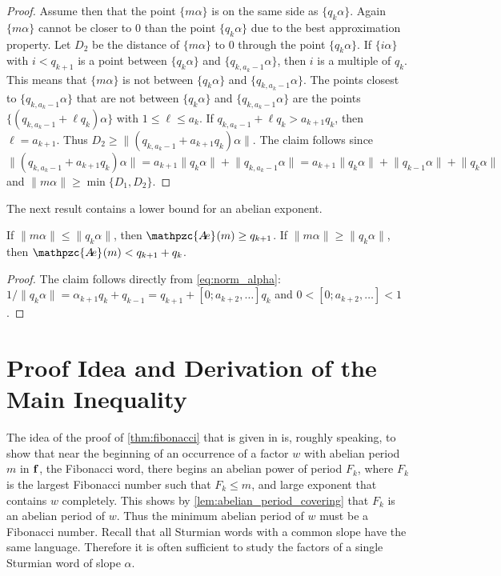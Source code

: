 \documentclass[a4paper,fleqn]{article}
\providecommand{\norm}[1]{\lVert#1\rVert}
\newcommand{\infw}[1]{%
  \ifcat\noexpand#1\relax\bm{#1}%
  \else\mathbf{#1}\fi}          %
\newcommand{\abexp}[2][]{\mathpzc{A\mkern-3mu e}_{#1}(#2)}
\begin{document}
\begin{proof}
    Assume then that the point $\{m\alpha\}$ is on the same side as $\{q_k\alpha\}$. Again $\{m\alpha\}$ cannot be
    closer to $0$ than the point $\{q_k\alpha\}$ due to the best approximation property. Let $D_2$ be the distance of
    $\{m\alpha\}$ to $0$ through the point $\{q_k\alpha\}$. If $\{i\alpha\}$ with $i < q_{k+1}$ is a point between
    $\{q_k\alpha\}$ and $\{q_{k,a_k-1}\alpha\}$, then $i$ is a multiple of $q_k$. This means that $\{m\alpha\}$ is not
    between $\{q_k\alpha\}$ and $\{q_{k,a_k-1}\alpha\}$. The points closest to $\{q_{k,a_k-1}\alpha\}$ that are not
    between $\{q_k\alpha\}$ and $\{q_{k,a_k-1}\alpha\}$ are the points $\{(q_{k,a_k-1} + \ell q_k)\alpha\}$ with
    $1 \leq \ell \leq a_k$. If $q_{k,a_k-1} + \ell q_k > a_{k+1}q_k$, then $\ell = a_{k+1}$. Thus
    $D_2 \geq \norm{(q_{k,a_k-1} + a_{k+1} q_k)\alpha}$. The claim follows since
    \begin{equation*}
      \norm{(q_{k,a_k-1} + a_{k+1} q_k)\alpha} = a_{k+1}\norm{q_k\alpha} + \norm{q_{k,a_k-1}\alpha} = a_{k+1}\norm{q_k\alpha} + \norm{q_{k-1}\alpha} + \norm{q_k\alpha}
    \end{equation*}
    and $\norm{m\alpha} \geq \min\{D_1, D_2\}$.
  \end{proof}

  The next result contains a lower bound for an abelian exponent.

  \begin{lemma}\label{lem:exponent_lower_bound}
    If $\norm{m\alpha} \leq \norm{q_k\alpha}$, then $\abexp{m} \geq q_{k+1}$. If $\norm{m\alpha} \geq
    \norm{q_k\alpha}$, then $\abexp{m} < q_{k+1} + q_k$.
  \end{lemma}
  \begin{proof}
    The claim follows directly from \eqref{eq:norm_alpha}:
    $1/\norm{q_k\alpha} = \alpha_{k+1}q_k + q_{k-1} = q_{k+1} + [0; a_{k+2}, \ldots]q_k$ and
    $0 < [0; a_{k+2}, \ldots] < 1$.
  \end{proof}

  \section{Proof Idea and Derivation of the Main Inequality}\label{sec:main_inequality}
  The idea of the proof of \autoref{thm:fibonacci} that is given in
  \cite{2016:abelian_powers_and_repetitions_in_sturmian_words} is, roughly speaking, to show that near the beginning of
  an occurrence of a factor $w$ with abelian period $m$ in $\infw{f}$, the Fibonacci word, there begins an abelian
  power of period $F_k$, where $F_k$ is the largest Fibonacci number such that $F_k \leq m$, and large exponent that
  contains $w$ completely. This shows by \autoref{lem:abelian_period_covering} that $F_k$ is an abelian period of $w$.
  Thus the minimum abelian period of $w$ must be a Fibonacci number. Recall that all Sturmian words with a common slope
  have the same language. Therefore it is often sufficient to study the factors of a single Sturmian word of slope
  $\alpha$.
\end{document}
